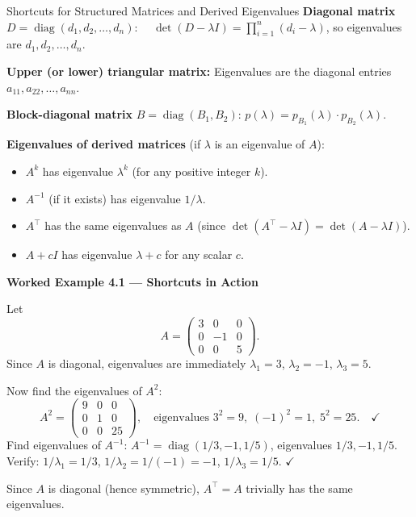 \documentclass[12pt,a4paper]{article}
\begin{document}
\begin{infobox}{Shortcuts for Structured Matrices and Derived Eigenvalues}
\textbf{Diagonal matrix} $D = \operatorname{diag}(d_1,d_2,\ldots,d_n)$:
$\quad \det(D-\lambda I) = \prod_{i=1}^n(d_i-\lambda)$, so eigenvalues are $d_1,d_2,\ldots,d_n$.

\textbf{Upper (or lower) triangular matrix:}
Eigenvalues are the diagonal entries $a_{11},a_{22},\ldots,a_{nn}$.

\textbf{Block-diagonal matrix} $B = \operatorname{diag}(B_1,B_2)$:
$p(\lambda) = p_{B_1}(\lambda)\cdot p_{B_2}(\lambda)$.

\textbf{Eigenvalues of derived matrices} (if $\lambda$ is an eigenvalue of $A$):
\begin{itemize}[leftmargin=*]
  \item $A^k$ has eigenvalue $\lambda^k$ (for any positive integer $k$).
  \item $A^{-1}$ (if it exists) has eigenvalue $1/\lambda$.
  \item $A^\top$ has the same eigenvalues as $A$ (since $\det(A^\top - \lambda I) = \det(A-\lambda I)$).
  \item $A + cI$ has eigenvalue $\lambda + c$ for any scalar $c$.
\end{itemize}
\end{infobox}

\textbf{Worked Example 4.1 --- Shortcuts in Action}

Let
\[
  A = \begin{pmatrix} 3 & 0 & 0 \\ 0 & -1 & 0 \\ 0 & 0 & 5 \end{pmatrix}.
\]
Since $A$ is diagonal, eigenvalues are immediately $\lambda_1=3$, $\lambda_2=-1$, $\lambda_3=5$.

Now find the eigenvalues of $A^2$:
\[
  A^2 = \begin{pmatrix} 9 & 0 & 0 \\ 0 & 1 & 0 \\ 0 & 0 & 25 \end{pmatrix},
  \quad \text{eigenvalues } 3^2=9,\; (-1)^2=1,\; 5^2=25. \quad \checkmark
\]
Find eigenvalues of $A^{-1}$: $A^{-1}=\operatorname{diag}(1/3,-1,1/5)$, eigenvalues $1/3,-1,1/5$.
Verify: $1/\lambda_1 = 1/3$, $1/\lambda_2 = 1/(-1) = -1$, $1/\lambda_3=1/5$. $\checkmark$

Since $A$ is diagonal (hence symmetric), $A^\top = A$ trivially has the same eigenvalues.

\end{document}

